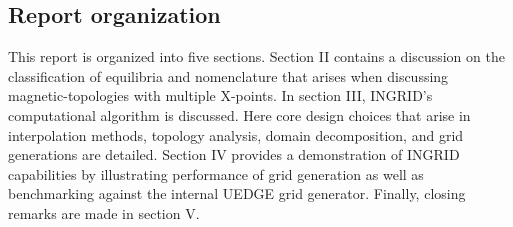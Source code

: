 \subsection{\label{sec:level2}Report organization}
This report is organized into five sections. Section II contains a discussion on the classification of equilibria and nomenclature that arises when discussing magnetic-topologies with multiple X-points. 
In section III, INGRID's computational algorithm is discussed. Here core design choices that arise in interpolation methods, topology analysis, domain decomposition, and grid generations are detailed. Section IV provides a demonstration of INGRID capabilities by illustrating performance of grid generation as well as benchmarking against the internal UEDGE grid generator. Finally, closing remarks are made in section V.